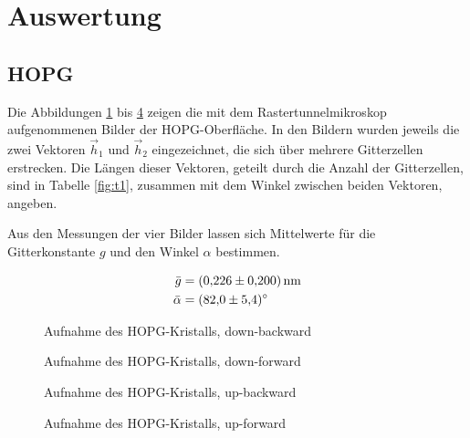 \documentclass[paper=a4]{scrartcl}
\begin{document}
\section{Auswertung}
\subsection{HOPG}

Die Abbildungen \ref{fig:down-backward} bis \ref{fig:up-forward} zeigen die mit dem Rastertunnelmikroskop aufgenommenen Bilder der HOPG-Oberfläche.
In den Bildern wurden jeweils die zwei Vektoren $\vec{h}_1$ und $\vec{h}_2$ eingezeichnet, die sich über mehrere Gitterzellen erstrecken.
Die Längen dieser Vektoren, geteilt durch die Anzahl der Gitterzellen, sind in Tabelle \ref{fig:t1}, zusammen mit dem Winkel zwischen beiden Vektoren, angeben.

Aus den Messungen der vier Bilder lassen sich Mittelwerte für die Gitterkonstante $g$ und den Winkel $\alpha$ bestimmen.

\begin{align}
	\bar{g} &= \SI{0,226 \pm 0,2}{\nano \meter}\\
	\bar{\alpha} &= \SI{82 \pm 5,4}{\degree}
\end{align}

\begin{figure}
	\centering
	\resizebox{12cm}{!}{
		
	}
	\caption{Aufnahme des HOPG-Kristalls, down-backward}
	\label{fig:down-backward}
\end{figure}

\begin{figure}
	\centering
	\resizebox{12cm}{!}{
		
	}
	\caption{Aufnahme des HOPG-Kristalls, down-forward}
	\label{fig:down-forward}
\end{figure}

\begin{figure}
	\centering
	\resizebox{12cm}{!}{
		
	}
	\caption{Aufnahme des HOPG-Kristalls, up-backward}
	\label{fig:up-backward}
\end{figure}

\begin{figure}
	\centering
	\resizebox{12cm}{!}{
		
	}
	\caption{Aufnahme des HOPG-Kristalls, up-forward}
	\label{fig:up-forward}
\end{figure}
\end{document}
